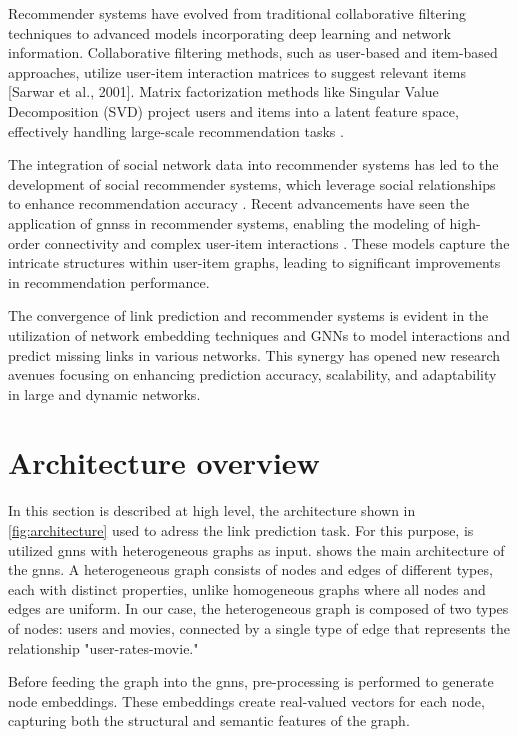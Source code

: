 \documentclass[11pt]{article}
\begin{document}
Recommender systems have evolved from traditional collaborative filtering techniques to advanced models 
incorporating deep learning and network information. Collaborative filtering methods, such as user-based 
and item-based approaches, utilize user-item interaction matrices to suggest relevant items [Sarwar et al., 2001]. 
Matrix factorization methods like Singular Value Decomposition (SVD) project users and items into a latent feature 
space, effectively handling large-scale recommendation tasks \cite{sarwar2001item}.

The integration of social network data into recommender systems has led to the development of social recommender 
systems, which leverage social relationships to enhance recommendation accuracy \cite{jamali2010matrix}. 
Recent advancements have seen the application of \acp{gnn}s in recommender systems, enabling the modeling of high-order 
connectivity and complex user-item interactions \cite{wang2019neural}. These models capture the intricate structures 
within user-item graphs, leading to significant improvements in recommendation performance.

The convergence of link prediction and recommender systems is evident in the utilization of network embedding 
techniques and GNNs to model interactions and predict missing links in various networks. This synergy has opened new 
research avenues focusing on enhancing prediction accuracy, scalability, and adaptability in large and dynamic networks.

\section{Architecture overview}\label{sec:architecture-overview}
In this section is described at high level, the architecture shown in \ref{fig:architecture} used to adress 
the link prediction task. 
For this purpose, is utilized \acp{gnn} with heterogeneous graphs 
as input.  shows the main architecture of the \acp{gnn}. 
A heterogeneous graph consists of nodes and edges of different types, 
each with distinct properties, unlike homogeneous graphs where all nodes and edges are 
uniform. In our case, the heterogeneous graph is composed of two types of nodes: 
users and movies, connected by a single type of edge that represents the relationship "user-rates-movie."

Before feeding the graph into the \acp{gnn}, pre-processing is performed to 
generate node embeddings. These embeddings create real-valued vectors for each node, 
capturing both the structural and semantic features of the graph.
\end{document}

